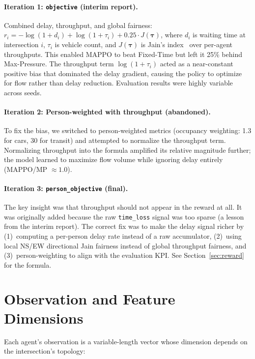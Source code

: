 \documentclass{article}
\begin{document}
\paragraph{Iteration 1: \texttt{objective} (interim report).}
Combined delay, throughput, and global fairness:
$r_i = -\log(1 + d_i) + \log(1 + \tau_i) + 0.25 \cdot J(\boldsymbol{\tau})$,
where $d_i$ is waiting time at intersection $i$, $\tau_i$ is vehicle count, and $J(\boldsymbol{\tau})$ is Jain's index~\cite{jain1984} over per-agent throughputs. This enabled MAPPO to beat Fixed-Time but left it 25\% behind Max-Pressure. The throughput term $\log(1+\tau_i)$ acted as a near-constant positive bias that dominated the delay gradient, causing the policy to optimize for flow rather than delay reduction. Evaluation results were highly variable across seeds.

\paragraph{Iteration 2: Person-weighted with throughput (abandoned).}
To fix the bias, we switched to person-weighted metrics (occupancy weighting: 1.3 for cars, 30 for transit) and attempted to normalize the throughput term. Normalizing throughput into the formula amplified its relative magnitude further; the model learned to maximize flow volume while ignoring delay entirely (MAPPO/MP $\approx 1.0$).

\paragraph{Iteration 3: \texttt{person\_objective} (final).}
The key insight was that throughput should not appear in the reward at all. It was originally added because the raw \texttt{time\_loss} signal was too sparse (a lesson from the interim report). The correct fix was to make the delay signal richer by (1)~computing a per-person delay rate instead of a raw accumulator, (2)~using local NS/EW directional Jain fairness instead of global throughput fairness, and (3)~person-weighting to align with the evaluation KPI. See Section~\ref{sec:reward} for the formula.


\section{Observation and Feature Dimensions}
\label{app:obs_features}

Each agent's observation is a variable-length vector whose dimension depends on the intersection's topology:
\end{document}
